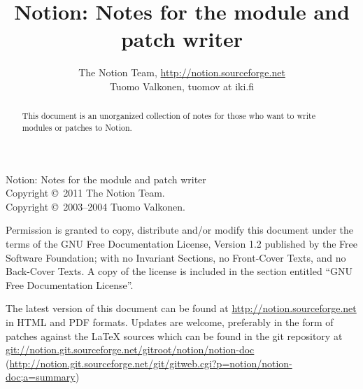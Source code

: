 \documentclass[english,a4paper,11pt,oldtoc,mctitle]{artikel3}
\title{Notion: Notes for the module and patch writer}
\author{The Notion Team, \url{http://notion.sourceforge.net} \\ 
	Tuomo Valkonen, tuomov at iki.fi}
\begin{document}
\maketitle

Notion: Notes for the module and patch writer\\
Copyright \copyright\  2011 The Notion Team.\\
Copyright \copyright\  2003--2004 Tuomo Valkonen.

Permission is granted to copy, distribute and/or modify this document
under the terms of the GNU Free Documentation License, Version 1.2
published by the Free Software Foundation;
with no Invariant Sections, no Front-Cover Texts, and no Back-Cover Texts.
A copy of the license is included in the section entitled ``GNU
Free Documentation License''.

The latest version of this document can be found at 
\url{http://notion.sourceforge.net} in HTML and PDF formats. Updates are
welcome, preferably in the form of patches against the \LaTeX{} sources which
can be found in the git repository at 
\url{git://notion.git.sourceforge.net/gitroot/notion/notion-doc} 
(\url{http://notion.git.sourceforge.net/git/gitweb.cgi?p=notion/notion-doc;a=summary})

\bigskip

\begin{abstract}
    This document is an unorganized collection of notes for
    those who want to write modules or patches to Notion.
\end{abstract}

\tableofcontents













\appendix





\printindex
\end{document}
